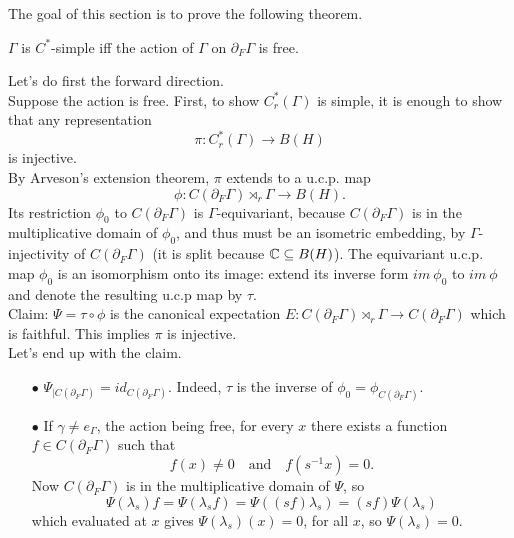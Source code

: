 The goal of this section is to prove the following theorem.

\begin{thm}
$\Gamma$ is $C^*$-simple iff the action of $\Gamma$ on $\partial_F \Gamma$ is free.
\end{thm}

Let's do first the forward direction.\\

Suppose the action is free. First, to show $C^*_r(\Gamma)$ is simple, it is enough to show that any representation 
\[\pi : C^*_r(\Gamma) \rightarrow B(H) \]
is injective. \\

By Arveson's extension theorem, $\pi$ extends to a u.c.p. map 
\[ \phi : C(\partial_F \Gamma)\rtimes_r \Gamma \rightarrow B(H). \]
Its restriction $\phi_0$ to $C(\partial_F \Gamma)$ is $\Gamma$-equivariant, because $C(\partial_F \Gamma)$ is in the multiplicative domain of $\phi_0$, and thus must be an isometric embedding, by $\Gamma$-injectivity of $C(\partial_F \Gamma)$ (it is split because $\mathbb C \subseteq B(H)$). The equivariant u.c.p. map $\phi_0$ is an isomorphism onto its image: extend its inverse form $im \  \phi_0$ to $im \ \phi$ and denote the resulting u.c.p map by $\tau$. \\

Claim: $\Psi = \tau \circ \phi $ is the canonical expectation $E : C(\partial_F \Gamma)\rtimes_r \Gamma \rightarrow C(\partial_F \Gamma)$ which is faithful. This implies $\pi$ is injective.\\

Let's end up with the claim. 
\begin{itemize}
\item[$\bullet$] $\Psi_{|C(\partial_F \Gamma)} = id_{C(\partial_F \Gamma)}$. Indeed, $\tau$ is the inverse of $\phi_0 = \phi_{C(\partial_F \Gamma)}$.
\item[$\bullet$] If $\gamma\neq e_\Gamma$, the action being free, for every $x$ there exists a function $f\in C(\partial_F \Gamma)$ such that 
\[f(x)\neq 0 \quad \text{and} \quad f(s^{-1}x) =0.\]
Now $C(\partial_F \Gamma)$ is in the multiplicative domain of $\Psi$, so
\[ \Psi(\lambda_s) f = \Psi( \lambda_s f) = \Psi( (sf)\lambda_s ) = (sf) \Psi( \lambda_s ) \]
which evaluated at $x$ gives $\Psi(\lambda_s)(x) = 0$, for all $x$, so $\Psi(\lambda_s)=0$. \\ 
\end{itemize}

